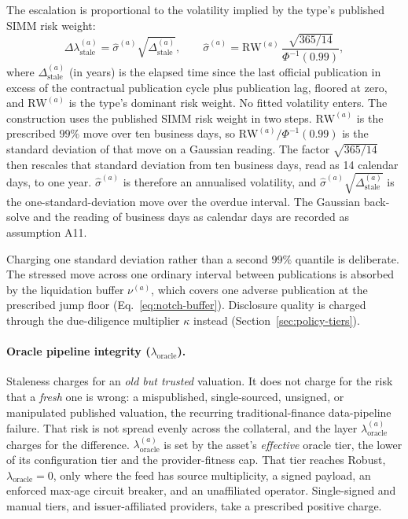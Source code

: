 The escalation is proportional to the volatility implied by the type's published SIMM risk weight:
\begin{equation}\label{eq:stale}
\Delta\lambda^{(a)}_{\mathrm{stale}}=\hat\sigma^{(a)}\sqrt{\Delta^{(a)}_{\mathrm{stale}}},
\qquad
\hat\sigma^{(a)}=\mathrm{RW}^{(a)}\,\frac{\sqrt{365/14}}{\Phi^{-1}(0.99)},
\end{equation}
where $\Delta^{(a)}_{\mathrm{stale}}$ (in years) is the elapsed time since the last official
publication in excess of the contractual publication cycle plus publication lag, floored at zero, and
$\mathrm{RW}^{(a)}$ is the type's dominant risk weight. No fitted volatility enters. The
construction uses the published SIMM risk weight in two steps. $\mathrm{RW}^{(a)}$ is the
prescribed $99\%$ move over ten business days, so $\mathrm{RW}^{(a)}/\Phi^{-1}(0.99)$ is the standard
deviation of that move on a Gaussian reading. The factor $\sqrt{365/14}$ then rescales that
standard deviation from ten business days, read as 14 calendar days, to one year.
$\hat\sigma^{(a)}$ is therefore an annualised volatility, and
$\hat\sigma^{(a)}\sqrt{\Delta^{(a)}_{\mathrm{stale}}}$ is the one-standard-deviation move over
the overdue interval. The Gaussian back-solve and the reading of business days as calendar
days are recorded as assumption A11.

Charging one standard deviation rather than a second $99\%$ quantile is deliberate. The
stressed move across one ordinary interval between publications is absorbed by the liquidation
buffer $\nu^{(a)}$, which covers one adverse publication at the prescribed jump floor
(Eq.~\eqref{eq:notch-buffer}). Disclosure quality is charged through the due-diligence
multiplier $\kappa$ instead (Section~\ref{sec:policy-tiers}).

\paragraph{Oracle pipeline integrity ($\lambda_{\mathrm{oracle}}$).} Staleness charges for an \emph{old but trusted} valuation. It does not charge for the risk that a \emph{fresh} one is wrong: a mispublished, single-sourced, unsigned, or manipulated published valuation, the recurring traditional-finance data-pipeline failure. That risk is not spread evenly across the collateral, and the layer $\lambda_{\mathrm{oracle}}^{(a)}$ charges for the difference. $\lambda_{\mathrm{oracle}}^{(a)}$ is set by the asset's \emph{effective} oracle tier, the lower of its configuration tier and the provider-fitness cap. That tier reaches Robust, $\lambda_{\mathrm{oracle}}=0$, only where the feed has source multiplicity, a signed payload, an enforced max-age circuit breaker, and an unaffiliated operator. Single-signed and manual tiers, and issuer-affiliated providers, take a prescribed positive charge.

